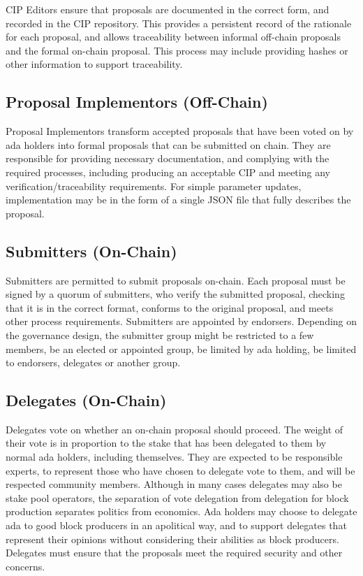 CIP Editors ensure that proposals are documented in the correct form, and recorded in the CIP repository.
This provides a persistent record of the rationale for each proposal, and allows traceability between informal off-chain
proposals and the formal on-chain proposal.  This process may include providing hashes or other information to support traceability.

\subsection{Proposal Implementors (Off-Chain)}

Proposal Implementors transform accepted proposals that have been voted on by ada holders into formal proposals that can be submitted on chain.
They are responsible for providing necessary documentation, and complying with the required processes, including producing an acceptable CIP
and meeting any verification/traceability requirements.  For simple parameter updates, implementation may be in the form of a single JSON
file that fully describes the proposal.

\subsection{Submitters (On-Chain)}

Submitters are permitted to submit proposals on-chain.  Each proposal must be signed by a quorum of submitters, who verify the submitted
proposal, checking that it is in the correct format, conforms to the original proposal, and meets other process requirements.
Submitters are appointed by endorsers.  Depending on the governance design, the submitter group might be restricted to a few members,
be an elected or appointed group, be limited by ada holding, be limited to endorsers, delegates or another group.

\subsection{Delegates (On-Chain)}

Delegates vote on whether an on-chain proposal should proceed.  The weight of
their vote is in proportion to the stake that has been delegated to them by
normal ada holders, including themselves.  They are expected to be responsible
experts, to represent those who have chosen to delegate vote to them, and will
be respected community members.  Although in many cases delegates may also be
stake pool operators, the separation of vote delegation from delegation for
block production separates politics from economics.  Ada holders may choose to
delegate ada to good block producers in an apolitical way, and to support
delegates that represent their opinions without considering their abilities as
block producers.  Delegates must ensure that the proposals meet the required
security and other concerns.

